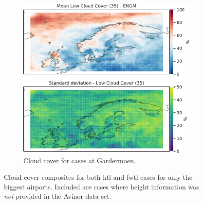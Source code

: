 \begin{figure}
    \begin{subfigure}[b]{0.5\textwidth}
    \centering
    \includegraphics[width=\textwidth]{Figures/CCENGM.pdf}
    \caption{Cloud cover for cases at Gardermoen.}
    \label{fig:ENGMCC}
\end{subfigure}
\caption{Cloud cover composites for both \acrshort{htl} and \acrshort{fwtl} cases for only the biggest airports. Included are cases where height information was \textit{not} provided in the Avinor data set.}
\label{fig:cloudcoverairports}
\end{figure}

